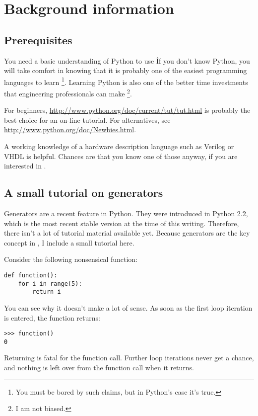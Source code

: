 \chapter{Background information}

\section{Prerequisites}

You need a basic understanding of Python to use \myhdl\.
If you don't know Python, you will take comfort in knowing
that it is probably one of the easiest programming languages to
learn \footnote{You must be bored by such claims, but in Python's
case it's true.}. Learning Python is also one of the better time
investments that engineering professionals can make \footnote{I am not
biased.}.

For beginners, \url{http://www.python.org/doc/current/tut/tut.html} is
probably the best choice for an on-line tutorial. For alternatives,
see \url{http://www.python.org/doc/Newbies.html}.

A working knowledge of a hardware description language such as Verilog
or VHDL is helpful. Chances are that you know one of those anyway, if
you are interested in \myhdl{}.

\section{A small tutorial on generators}

Generators are a recent feature in Python. They were introduced in
Python 2.2, which is the most recent stable version at the time of
this writing. Therefore, there isn't a lot of tutorial material
available yet. Because generators are the key concept in
\myhdl{}, I include a small tutorial here.

Consider the following nonsensical function:

\begin{verbatim}
def function():
    for i in range(5):
        return i

\end{verbatim}

You can see why it doesn't make a lot of sense. As soon as the first
loop iteration is entered, the function returns:

\begin{verbatim}
>>> function()
0
\end{verbatim}

Returning is fatal for the function call. Further loop iterations
never get a chance, and nothing is left over from the function call
when it returns.

